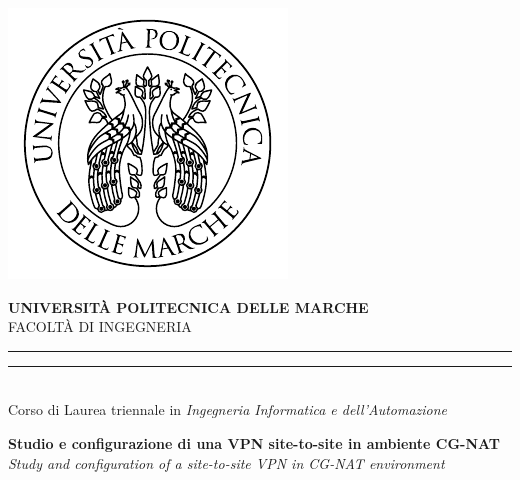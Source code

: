 \begin{titlepage}
    \begin{center}
        \includegraphics[scale=0.85]{immagini/UnivpmLogo.pdf} \\
        \vspace{5mm}

        {{\Large{\textbf{\large{UNIVERSITÀ POLITECNICA DELLE MARCHE}}}}} \\
        \vspace{3mm}
        \small{FACOLTÀ DI INGEGNERIA}
        \vspace{3.5mm}

        \rule[0.1cm]{17cm}{0.1mm}
        \rule[0.5cm]{17cm}{0.6mm}
        \\

        \large{{
                    Corso di Laurea triennale in \textit{Ingegneria Informatica e dell'Automazione}
                }}\\

    \end{center}

    \vspace{18mm}
    \begin{center}

        {
            \LARGE{
                \bf Studio e configurazione di una VPN site-to-site in ambiente CG-NAT
            }
        }\\

        \vspace{6mm}
        \Large{
            \textit{
                Study and configuration of a site-to-site VPN in CG-NAT environment
            }
        }\\

        \vspace{15mm}
    \end{center}
    \vspace{20mm}


\end{titlepage}
